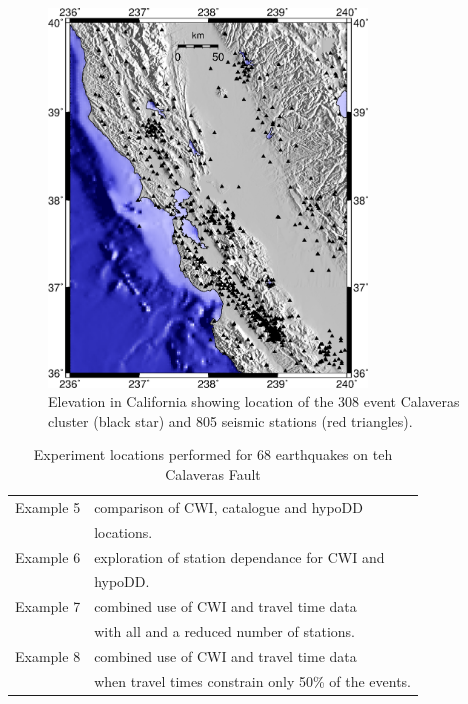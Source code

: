 \documentclass[extra]{gji}
\begin{document}
\begin{figure}
\noindent\includegraphics[width =
20pc]{diags/CalaverasMap/gmt_california/CaliforniaCalaverasMap1.eps}
\caption{Elevation in California showing location of the 308 event
Calaveras cluster (black star) and 805 seismic stations (red
triangles).} \label{fig:-eqopti-California-Calaveras}
\end{figure}


\begin{table}
\caption{Experiment locations performed for 68 earthquakes on teh
Calaveras Fault} \label{tab:examples}
\begin{tabular}{ll}
\hline
Example 5 & comparison of CWI, catalogue and hypoDD \\
 & locations. \\
Example 6 & exploration of station dependance for CWI and \\
 & hypoDD. \\
Example 7 & combined use of CWI and travel time data \\
& with all and a reduced number of stations. \\
Example 8 & combined use of CWI and travel time data \\
 & when travel times constrain only 50\% of the events. \\
 \hline
\end{tabular}
\end{table}
\end{document}
